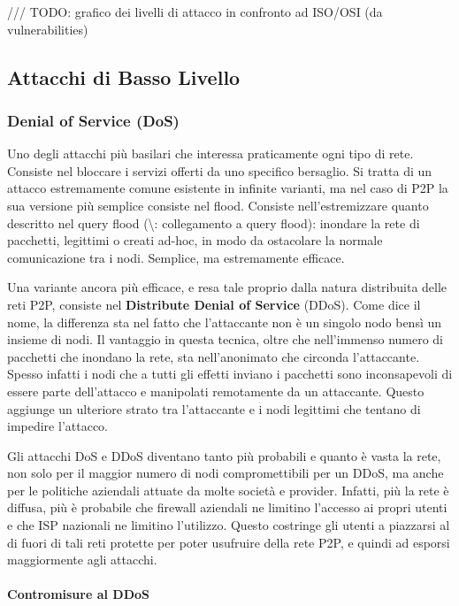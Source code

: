 /// TODO: grafico dei livelli di attacco in confronto ad ISO/OSI (da
vulnerabilities)

\subsection{Attacchi di Basso Livello}\label{attacchi-di-basso-livello}

\subsubsection{Denial of Service (DoS)}\label{denial-of-service-dos}

Uno degli attacchi più basilari che interessa praticamente ogni tipo di
rete. Consiste nel bloccare i servizi offerti da uno specifico
bersaglio. Si tratta di un attacco estremamente comune esistente in
infinite varianti, ma nel caso di P2P la sua versione più semplice
consiste nel flood. Consiste nell'estremizzare quanto descritto nel
query flood (\textbackslash{}\TODO: collegamento a query flood):
inondare la rete di pacchetti, legittimi o creati ad-hoc, in modo da
ostacolare la normale comunicazione tra i nodi. Semplice, ma
estremamente efficace.

Una variante ancora più efficace, e resa tale proprio dalla natura
distribuita delle reti P2P, consiste nel \textbf{Distribute Denial of
Service} (DDoS). Come dice il nome, la differenza sta nel fatto che
l'attaccante non è un singolo nodo bensì un insieme di nodi. Il
vantaggio in questa tecnica, oltre che nell'immenso numero di pacchetti
che inondano la rete, sta nell'anonimato che circonda l'attaccante.
Spesso infatti i nodi che a tutti gli effetti inviano i pacchetti sono
inconsapevoli di essere parte dell'attacco e manipolati remotamente da
un attaccante. Questo aggiunge un ulteriore strato tra l'attaccante e i
nodi legittimi che tentano di impedire l'attacco.

Gli attacchi DoS e DDoS diventano tanto più probabili e quanto è vasta
la rete, non solo per il maggior numero di nodi compromettibili per un
DDoS, ma anche per le politiche aziendali attuate da molte società e
provider. Infatti, più la rete è diffusa, più è probabile che firewall
aziendali ne limitino l'accesso ai propri utenti e che ISP nazionali ne
limitino l'utilizzo. Questo costringe gli utenti a piazzarsi al di fuori
di tali reti protette per poter usufruire della rete P2P, e quindi ad
esporsi maggiormente agli attacchi.

\paragraph{Contromisure al DDoS}\label{contromisure-al-ddos}

